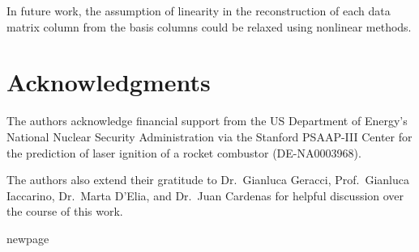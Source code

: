 \documentclass[preprint,10pt]{elsarticle}
\begin{document}
In future work, the assumption of linearity in the reconstruction of each data matrix column from the basis columns could be relaxed using nonlinear methods. 




\section*{Acknowledgments}

The authors acknowledge financial support from the US Department of Energy’s National Nuclear Security Administration via the Stanford PSAAP-III Center for the prediction of laser ignition of a rocket combustor (DE-NA0003968).

The authors also extend their gratitude to Dr.\ Gianluca Geracci, Prof.\ Gianluca Iaccarino, Dr.\ Marta D'Elia, and Dr.\ Juan Cardenas for helpful discussion over the course of this work.







newpage
\appendix
\end{document}
